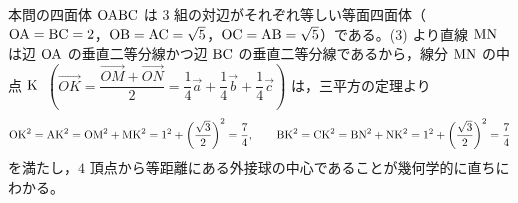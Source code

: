 \begin{betsu}
本問の四面体 $\mathrm{OABC}$ は $3$ 組の対辺がそれぞれ等しい等面四面体（$\mathrm{OA}=\mathrm{BC}=2$，$\mathrm{OB}=\mathrm{AC}=\sqrt{5}$，$\mathrm{OC}=\mathrm{AB}=\sqrt{5}$）である。(3) より直線 $\mathrm{MN}$ は辺 $\mathrm{OA}$ の垂直二等分線かつ辺 $\mathrm{BC}$ の垂直二等分線であるから，線分 $\mathrm{MN}$ の中点 $\mathrm{K}$\ $\left(\Vec{OK}=\dfrac{\Vec{OM}+\Vec{ON}}{2}=\dfrac{1}{4}\vec{a}+\dfrac{1}{4}\vec{b}+\dfrac{1}{4}\vec{c}\right)$ は，三平方の定理より
\[
  \mathrm{OK}^{2}=\mathrm{AK}^{2}=\mathrm{OM}^{2}+\mathrm{MK}^{2}=1^{2}+\left(\frac{\sqrt{3}}{2}\right)^{2}=\frac{7}{4},\qquad
  \mathrm{BK}^{2}=\mathrm{CK}^{2}=\mathrm{BN}^{2}+\mathrm{NK}^{2}=1^{2}+\left(\frac{\sqrt{3}}{2}\right)^{2}=\frac{7}{4}
\]
を満たし，$4$ 頂点から等距離にある外接球の中心であることが幾何学的に直ちにわかる。
\end{betsu}


